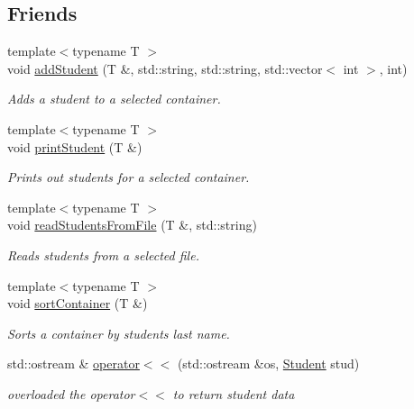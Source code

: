 \subsection*{Friends}
\begin{DoxyCompactItemize}
\item 
{\footnotesize template$<$typename T $>$ }\\void \mbox{\hyperlink{class_student_acdbfa6cd31d8219452acb6fe8d33f9f4}{add\+Student}} (T \&, std\+::string, std\+::string, std\+::vector$<$ int $>$, int)
\begin{DoxyCompactList}\small\item\em Adds a student to a selected container. \end{DoxyCompactList}\item 
{\footnotesize template$<$typename T $>$ }\\void \mbox{\hyperlink{class_student_ade7fdda87cc4f6baed40035bf86be5ac}{print\+Student}} (T \&)
\begin{DoxyCompactList}\small\item\em Prints out students for a selected container. \end{DoxyCompactList}\item 
{\footnotesize template$<$typename T $>$ }\\void \mbox{\hyperlink{class_student_a6e26d421e3d6104e444822f280523514}{read\+Students\+From\+File}} (T \&, std\+::string)
\begin{DoxyCompactList}\small\item\em Reads students from a selected file. \end{DoxyCompactList}\item 
{\footnotesize template$<$typename T $>$ }\\void \mbox{\hyperlink{class_student_a094a3acbb560126e8bb80b657d0e2a1b}{sort\+Container}} (T \&)
\begin{DoxyCompactList}\small\item\em Sorts a container by students last name. \end{DoxyCompactList}\item 
std\+::ostream \& \mbox{\hyperlink{class_student_a3f98f5b1b8210de4bbeef7a49249dec7}{operator$<$$<$}} (std\+::ostream \&os, \mbox{\hyperlink{class_student}{Student}} stud)
\begin{DoxyCompactList}\small\item\em overloaded the operator$<$$<$ to return student data \end{DoxyCompactList}\end{DoxyCompactItemize}


